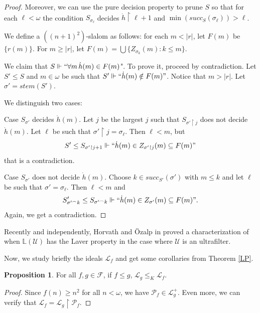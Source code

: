 \documentclass{amsart}
\theoremstyle{definition}
\newtheorem{proposition}[theorem]{Proposition}
\theoremstyle{remark}
\numberwithin{equation}{section}
\newcommand{\lf}{\mathcal{L}_f}
\begin{document}
\begin{proof}
Moreover, we can use the pure decision property to prune $S$ so that for each $\ell<\omega$ the condition $S_{\sigma_\ell}$ decides $\dot h\upharpoonright \ell+1$ and $\min(succ_S(\sigma_\ell))>\ell$.

We define a $((n+1)^2)$-slalom as follows: for each $m<|r|$, let $F(m)$ be $\{r(m)\}$. For $m\geq |r|$, let $F(m)= \bigcup\{ Z_{\sigma_k}(m): k\leq m\}$.

We claim that $S\Vdash`` \forall m \, \dot h(m)\in F(m)$". To prove it, proceed by contradiction. Let $S'\leq S$ and $m\in \omega$ be such that $S'\Vdash`` \dot h(m)\notin F(m)"$. Notice that $m>|r|$. Let $\sigma '=stem(S')$.

We distinguish two cases:

Case $S_{\sigma'}$ decides $\dot h(m)$. Let $j$ be the largest $j$ such that $S_{\sigma'\upharpoonright j}$ does not decide $\dot h(m)$. Let $\ell$ be such that $\sigma'\upharpoonright j=\sigma_\ell$. Then $\ell<m$, but 
\begin{displaymath}
 S'\leq S_{\sigma'\upharpoonright j+1}\Vdash ``\dot h(m)\in Z_{\sigma'\upharpoonright j}(m)\subseteq F(m)"
\end{displaymath}
that is a contradiction.

Case $S_{\sigma'}$ does not decide $\dot h(m)$. Choose $k\in succ_{S'}(\sigma')$  with $m\leq k$ and let $\ell$ be such that $\sigma'=\sigma_\ell$. Then $\ell<m$ and
\begin{displaymath}
   S'_{\sigma'^\frown k}\leq S_{\sigma'^\frown k}\Vdash ``\dot h(m)\in Z_{\sigma'}(m)\subseteq F(m)". 
\end{displaymath}
Again, we get a contradiction.
\end{proof}

Recently and independently, Horvath and Özalp in \cite{laverultrafilters} proved a characterization of when $\mathbb{L}(\mathcal{U})$ has the Laver property in the case where $\mathcal{U}$ is an ultrafilter.

Now, we study briefly the ideals $\lf$ and get some corollaries from Theorem \ref{LP}.

\begin{proposition}\label{n2max}
    For all $f,g\in \mathcal{F}$, if $f\leq g$, $\mathcal{L}_g \leq_K \mathcal{L}_f$.
\end{proposition}

\begin{proof}
    Since $f(n)\geq n^2$ for all $n<\omega$, we have $\mathcal{P}_f\in\mathcal{L}_g^+$. Even more, we can verify that $\mathcal{L}_f = \mathcal{L}_g\upharpoonright \mathcal{P}_f$.
    
\end{proof}
\end{document}
